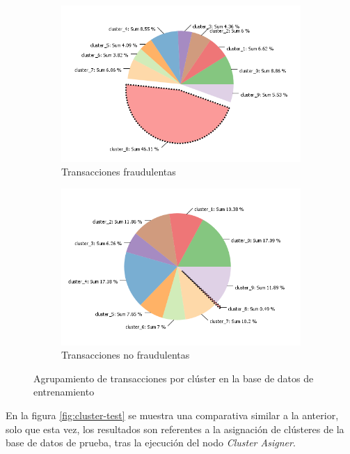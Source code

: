  \begin{figure} [H]
 	\centering
 	\begin{subfigure}[b]{0.45 \linewidth}
 			\includegraphics[width=\linewidth]{"figuras/Jenn/cluster en train (1)"}
 			\caption{Transacciones fraudulentas}
 			\label{fig:cluster-en-train-1}		
 	\end{subfigure}
 \begin{subfigure}[b]{0.45 \linewidth}
 	\includegraphics[width=\linewidth]{"figuras/Jenn/cluster en train (2)"}
 	\caption{Transacciones no fraudulentas}
 	\label{fig:cluster-en-train-2}		
 \end{subfigure}
	\caption{Agrupamiento de transacciones por clúster en la base de datos de entrenamiento}
	\label{fig:cluster-train}
 \end{figure}

En la figura \ref{fig:cluster-test} se muestra una comparativa similar a la anterior, solo que esta vez, los resultados son referentes a la asignación de clústeres de la base de datos de prueba, tras la ejecución del nodo \textit{Cluster Asigner}.

